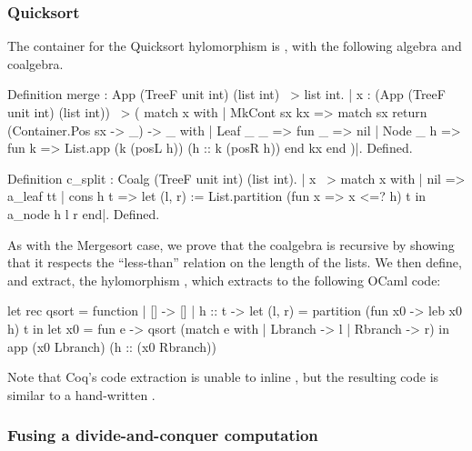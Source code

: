 \documentclass[anonymous, a4paper, UKenglish, cleveref, autoref, thm-restate]{lipics-v2021}
\begin{document}
\subsubsection{Quicksort}

The container for the Quicksort hylomorphism is , with
the following algebra and coalgebra.
\begin{coqcode}
  Definition merge : App (TreeF unit int) (list int) ~> list int.
|{ x : (App (TreeF unit int) (list int)) ~> (
           match x with
           | MkCont sx kx =>
               match sx return (Container.Pos sx -> _) -> _ with
               | Leaf _ _ => fun _ => nil
               | Node _ h => fun k => List.app (k (posL h)) (h :: k (posR h))
               end kx
           end
  )}|.
Defined.

Definition c_split : Coalg (TreeF unit int) (list int).
|{ x ~> match x with
        | nil => a_leaf tt
        | cons h t => let (l, r) := List.partition (fun x => x <=? h) t in
                      a_node h l r
        end}|.
Defined.
\end{coqcode}
As with the Mergesort case, we prove that the coalgebra is recursive by showing
that it respects the ``less-than'' relation on the length of the lists.
We then define, and extract, the hylomorphism , which
extracts to the following OCaml code:
\begin{ocamlcode}
let rec qsort = function
| [] -> [] | h :: t ->
  let (l, r) = partition (fun x0 -> leb x0 h) t in
  let x0 = fun e -> qsort (match e with | Lbranch -> l | Rbranch -> r) in 
  app (x0 Lbranch) (h :: (x0 Rbranch))
\end{ocamlcode}
Note that Coq's code extraction is unable to inline , but the resulting
code is similar to a hand-written .

\subsubsection{Fusing a divide-and-conquer computation}
\end{document}
